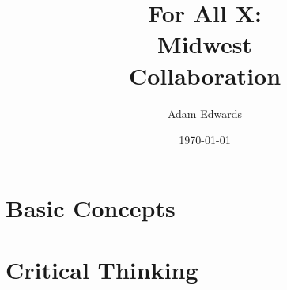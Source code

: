 \documentclass[nobib]{tufte-book}
\title{For All X: \\ Midwest \\ Collaboration}
\author[Adam Edwards]{Adam Edwards}
\date{\today}
\begin{document}

\frontmatter

\pagestyle{empty}
\setlength{\parindent}{0pt}
\setlength{\parskip}{\baselineskip}



\setlength{\parskip}{0em}

\begin{fullwidth}
\tableofcontents
\end{fullwidth}

%
%

\mainmatter

\listoffigures
\newpage
\listoftables

\part{Basic Concepts}\label{part:basic_concepts}
\setlength{\parindent}{1em}



%

\part{Critical Thinking}\label{part:critical_thinking}
%
%
%
%
%
%
%
%
%

%
%
%
%
%

%
%
%
%
\end{document}
